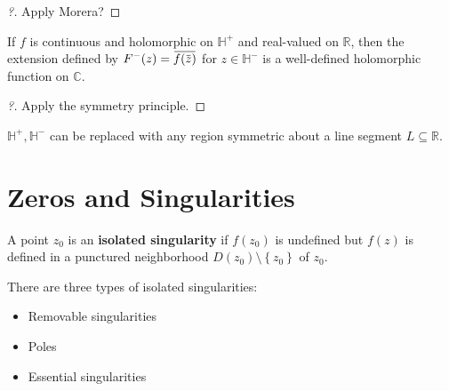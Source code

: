 \begin{proof}[?]

Apply Morera?

\end{proof}

\begin{theorem}\label{SchwarzReflection}

If \(f\) is continuous and holomorphic on \({\mathbb{H}}^+\) and
real-valued on \({\mathbb{R}}\), then the extension defined by
\(F^-(z) = \mkern 1.5mu\overline{\mkern-1.5muf(\mkern 1.5mu\overline{\mkern-1.5muz\mkern-1.5mu}\mkern 1.5mu)\mkern-1.5mu}\mkern 1.5mu\)
for \(z\in {\mathbb{H}}^-\) is a well-defined holomorphic function on
\({\mathbb{C}}\).

\end{theorem}

\begin{proof}[?]

Apply the symmetry principle.

\end{proof}

\begin{remark}

\({\mathbb{H}}^+, {\mathbb{H}}^-\) can be replaced with any region
symmetric about a line segment \(L\subseteq {\mathbb{R}}\).

\end{remark}

\hypertarget{zeros-and-singularities}{%
\section{Zeros and Singularities}\label{zeros-and-singularities}}

\begin{definition}[Singularity]

A point \(z_0\) is an \textbf{isolated singularity} if \(f(z_0)\) is
undefined but \(f(z)\) is defined in a punctured neighborhood
\(D(z_0)\setminus\left\{{z_0}\right\}\) of \(z_0\).

There are three types of isolated singularities:

\begin{itemize}
\tightlist
\item
  Removable singularities
\item
  Poles
\item
  Essential singularities
\end{itemize}

\end{definition}

